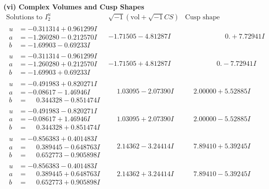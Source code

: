 \documentclass[1p]{elsarticle_modified}
\theoremstyle{definition}
\newcommand{\I}{\sqrt{-1}}
\begin{document}
\newpage\flushleft \textbf{(vi) Complex Volumes and Cusp Shapes}
$$\begin{array}{c|c|c}  
\text{Solutions to }I^u_{2}& \I (\text{vol} + \sqrt{-1}CS) & \text{Cusp shape}\\
 \hline 
\begin{aligned}
u &= -0.311314 + 0.961299 I \\
a &= -1.260280 - 0.212570 I \\
b &= -1.69903 - 0.69233 I\end{aligned}
 & -1.71505 - 4.81287 I & \phantom{-0.000000 -}0. + 7.72941 I \\ \hline\begin{aligned}
u &= -0.311314 - 0.961299 I \\
a &= -1.260280 + 0.212570 I \\
b &= -1.69903 + 0.69233 I\end{aligned}
 & -1.71505 + 4.81287 I & \phantom{-0.000000 } 0. - 7.72941 I \\ \hline\begin{aligned}
u &= -0.491983 + 0.820271 I \\
a &= -0.08617 - 1.46946 I \\
b &= \phantom{-}0.344328 - 0.851474 I\end{aligned}
 & \phantom{-}1.03095 - 2.07390 I & \phantom{-}2.00000 + 5.52885 I \\ \hline\begin{aligned}
u &= -0.491983 - 0.820271 I \\
a &= -0.08617 + 1.46946 I \\
b &= \phantom{-}0.344328 + 0.851474 I\end{aligned}
 & \phantom{-}1.03095 + 2.07390 I & \phantom{-}2.00000 - 5.52885 I \\ \hline\begin{aligned}
u &= -0.856383 + 0.401483 I \\
a &= \phantom{-}0.389445 - 0.648763 I \\
b &= \phantom{-}0.652773 - 0.905898 I\end{aligned}
 & \phantom{-}2.14362 - 3.24414 I & \phantom{-}7.89410 + 5.39245 I \\ \hline\begin{aligned}
u &= -0.856383 - 0.401483 I \\
a &= \phantom{-}0.389445 + 0.648763 I \\
b &= \phantom{-}0.652773 + 0.905898 I\end{aligned}
 & \phantom{-}2.14362 + 3.24414 I & \phantom{-}7.89410 - 5.39245 I \\ \hline\begin{aligned}

\end{aligned}
\end{array}$$
\end{document}
